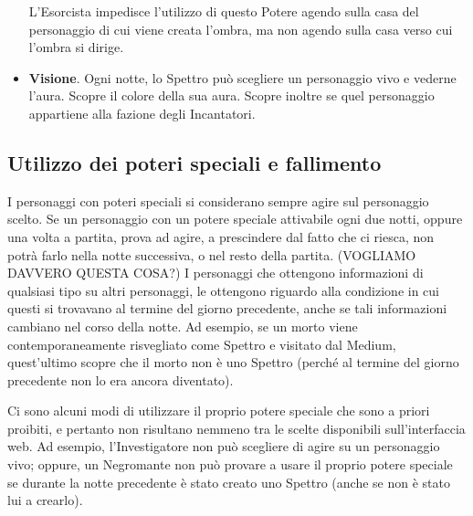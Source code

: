 \documentclass[a4paper,10pt]{article}
\begin{document}
\begin{itemize}
 L'Esorcista impedisce l'utilizzo di questo Potere agendo sulla casa del personaggio di cui viene creata l'ombra, ma non agendo sulla casa verso cui l'ombra si dirige.
 
 \item {\bf Visione}. Ogni notte, lo Spettro può scegliere un personaggio vivo e vederne l'aura. Scopre il colore della sua aura. Scopre inoltre se quel personaggio appartiene alla fazione degli Incantatori.
 
%  

\end{itemize}


\subsection{Utilizzo dei poteri speciali e fallimento}
\label{fallimento}

I personaggi con poteri speciali si considerano sempre agire sul personaggio scelto. %
Se un personaggio con un potere speciale attivabile ogni due notti, oppure una volta a partita, prova ad agire, a prescindere dal fatto che ci riesca, non potrà farlo nella notte successiva, o nel resto della partita. (VOGLIAMO DAVVERO QUESTA COSA?)
I personaggi che ottengono informazioni di qualsiasi tipo su altri personaggi, le ottengono riguardo alla condizione in cui questi si trovavano al termine del giorno precedente, anche se tali informazioni cambiano nel corso della notte.
Ad esempio, se un morto viene contemporaneamente risvegliato come Spettro e visitato dal Medium, quest'ultimo scopre che il morto non è uno Spettro (perché al termine del giorno precedente non lo era ancora diventato).

Ci sono alcuni modi di utilizzare il proprio potere speciale che sono a priori proibiti, e pertanto non risultano nemmeno tra le scelte disponibili sull'interfaccia web. Ad esempio, l'Investigatore non può scegliere di agire su un personaggio vivo; oppure, un Negromante non può provare a usare il proprio potere speciale se durante la notte precedente è stato creato uno Spettro (anche se non è stato lui a crearlo).
\end{document}
